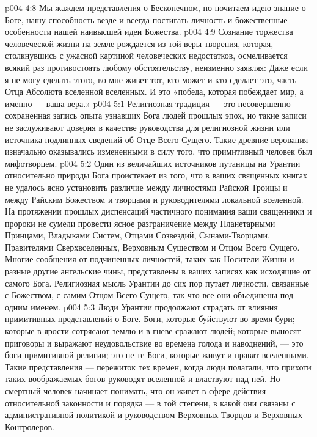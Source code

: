 \vs p004 4:8 Мы жаждем представления о Бесконечном, но почитаем идею\hyp{}знание о Боге, нашу способность везде и всегда постигать личность и божественные особенности нашей наивысшей идеи Божества.
\vs p004 4:9 Сознание торжества человеческой жизни на земле рождается из той веры творения, которая, столкнувшись с ужасной картиной человеческих недостатков, осмеливается всякий раз противостоять любому обстоятельству, неизменно заявляя: Даже если я не могу сделать этого, во мне живет тот, кто может и кто сделает это, часть Отца Абсолюта вселенной вселенных. И это «победа, которая побеждает мир, а именно --- ваша вера.»
\vs p004 5:1 Религиозная традиция --- это несовершенно сохраненная запись опыта узнавших Бога людей прошлых эпох, но такие записи не заслуживают доверия в качестве руководства для религиозной жизни или источника подлинных сведений об Отце Всего Сущего. Такие древние верования изначально оказывались измененными в силу того, что примитивный человек был мифотворцем.
\vs p004 5:2 Один из величайших источников путаницы на Урантии относительно природы Бога проистекает из того, что в ваших священных книгах не удалось ясно установить различие между личностями Райской Троицы и между Райским Божеством и творцами и руководителями локальной вселенной. На протяжении прошлых диспенсаций частичного понимания ваши священники и пророки не сумели провести ясное разграничение между Планетарными Принцами, Владыками Систем, Отцами Созвездий, Сынами\hyp{}Творцами, Правителями Сверхвселенных, Верховным Существом и Отцом Всего Сущего. Многие сообщения от подчиненных личностей, таких как Носители Жизни и разные другие ангельские чины, представлены в ваших записях как исходящие от самого Бога. Религиозная мысль Урантии до сих пор путает личности, связанные с Божеством, с самим Отцом Всего Сущего, так что все они объединены под одним именем.
\vs p004 5:3 \pc Люди Урантии продолжают страдать от влияния примитивных представлений о Боге. Боги, которые буйствуют во время бури; которые в ярости сотрясают землю и в гневе сражают людей; которые выносят приговоры и выражают неудовольствие во времена голода и наводнений, --- это боги примитивной религии; это не те Боги, которые живут и правят вселенными. Такие представления --- пережиток тех времен, когда люди полагали, что прихоти таких воображаемых богов руководят вселенной и властвуют над ней. Но смертный человек начинает понимать, что он живет в сфере действия относительной законности и порядка --- в той степени, в какой они связаны с административной политикой и руководством Верховных Творцов и Верховных Контролеров.
